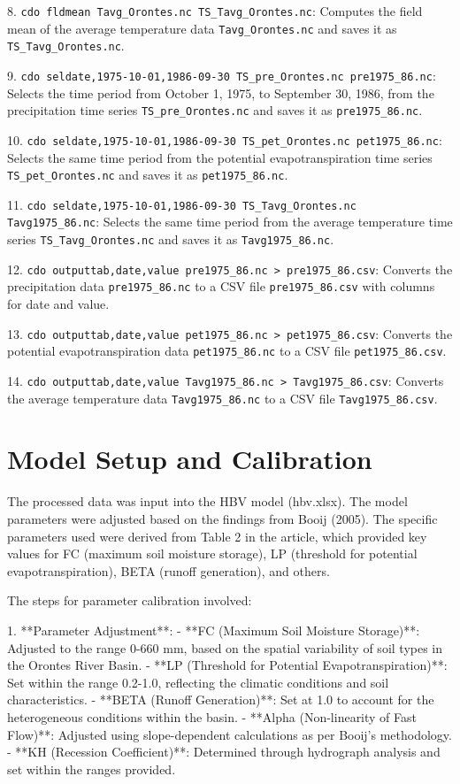 \documentclass[a4paper, 12pt]{article}
\begin{document}
8. \texttt{cdo fldmean Tavg\_Orontes.nc TS\_Tavg\_Orontes.nc}: Computes the field mean of the average temperature data \texttt{Tavg\_Orontes.nc} and saves it as \texttt{TS\_Tavg\_Orontes.nc}.

9. \texttt{cdo seldate,1975-10-01,1986-09-30 TS\_pre\_Orontes.nc pre1975\_86.nc}: Selects the time period from October 1, 1975, to September 30, 1986, from the precipitation time series \texttt{TS\_pre\_Orontes.nc} and saves it as \texttt{pre1975\_86.nc}.

10. \texttt{cdo seldate,1975-10-01,1986-09-30 TS\_pet\_Orontes.nc pet1975\_86.nc}: Selects the same time period from the potential evapotranspiration time series \texttt{TS\_pet\_Orontes.nc} and saves it as \texttt{pet1975\_86.nc}.

11. \texttt{cdo seldate,1975-10-01,1986-09-30 TS\_Tavg\_Orontes.nc Tavg1975\_86.nc}: Selects the same time period from the average temperature time series \texttt{TS\_Tavg\_Orontes.nc} and saves it as \texttt{Tavg1975\_86.nc}.

12. \texttt{cdo outputtab,date,value pre1975\_86.nc > pre1975\_86.csv}: Converts the precipitation data \texttt{pre1975\_86.nc} to a CSV file \texttt{pre1975\_86.csv} with columns for date and value.

13. \texttt{cdo outputtab,date,value pet1975\_86.nc > pet1975\_86.csv}: Converts the potential evapotranspiration data \texttt{pet1975\_86.nc} to a CSV file \texttt{pet1975\_86.csv}.

14. \texttt{cdo outputtab,date,value Tavg1975\_86.nc > Tavg1975\_86.csv}: Converts the average temperature data \texttt{Tavg1975\_86.nc} to a CSV file \texttt{Tavg1975\_86.csv}.


\section{Model Setup and Calibration}
The processed data was input into the HBV model (hbv.xlsx). The model parameters were adjusted based on the findings from Booij (2005). The specific parameters used were derived from Table 2 in the article, which provided key values for FC (maximum soil moisture storage), LP (threshold for potential evapotranspiration), BETA (runoff generation), and others.

The steps for parameter calibration involved:

1. **Parameter Adjustment**:
   - **FC (Maximum Soil Moisture Storage)**: Adjusted to the range 0-660 mm, based on the spatial variability of soil types in the Orontes River Basin.
   - **LP (Threshold for Potential Evapotranspiration)**: Set within the range 0.2-1.0, reflecting the climatic conditions and soil characteristics.
   - **BETA (Runoff Generation)**: Set at 1.0 to account for the heterogeneous conditions within the basin.
   - **Alpha (Non-linearity of Fast Flow)**: Adjusted using slope-dependent calculations as per Booij’s methodology.
   - **KH (Recession Coefficient)**: Determined through hydrograph analysis and set within the ranges provided.
\end{document}
